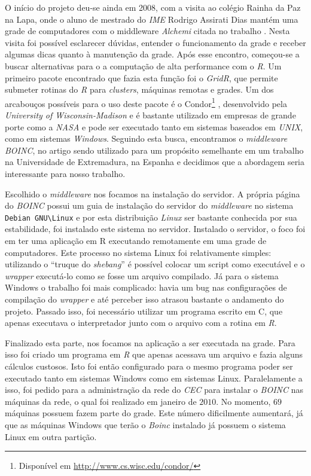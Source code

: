 
O início do projeto deu-se ainda em 2008, com a visita ao colégio Rainha da Paz na Lapa, onde o aluno de mestrado do \textit{IME}
Rodrigo Assirati Dias mantém uma grade de computadores com o middleware \textit{Alchemi} citada no trabalho \cite{Dias}.
Nesta visita foi possível esclarecer dúvidas, entender o funcionamento da grade e receber algumas dicas quanto à manutenção da grade. 
Após esse encontro, começou-se a buscar alternativas para o a computação de alta performance com o \textit{R}. Um primeiro pacote encontrado
que fazia esta função foi o \textit{GridR}, que permite submeter rotinas do \textit{R} para \textit{clusters}, máquinas remotas e 
grades. Um dos arcabouços possíveis para o uso deste pacote é o Condor\footnote{Disponível em \url{http://www.cs.wisc.edu/condor/}}
, desenvolvido pela \textit{University of Wisconsin-Madison} e é bastante utilizado em empresas
de grande porte como a \textit{NASA} e pode ser executado tanto em sistemas
baseados em \textit{UNIX}, como em sistemas \textit{Windows}. Seguindo esta busca, encontramos o 
\textit{middleware} \textit{BOINC}, no artigo \cite{boinc}
sendo utilizado para um propósito semelhante em um trabalho na Universidade de Extremadura, na Espanha 
e decidimos que a abordagem seria interessante para nosso trabalho.

Escolhido o \textit{middleware} nos focamos na instalação do servidor. A própria página do \textit{BOINC} 
possui um guia de instalação do servidor do \textit{middleware} no sistema \verb#Debian GNU\Linux# e por
esta distribuição \textit{Linux} ser bastante conhecida por sua estabilidade, foi instalado este sistema no servidor.
Instalado o servidor, o foco foi em ter uma aplicação em R executando remotamente em uma grade de computadores. 
Este processo no sistema Linux foi relativamente simples: utilizando o ``truque do \textit{shebang}'' é possível 
colocar um script como executável e o \textit{wrapper} executá-lo como se fosse um arquivo compilado. Já para
o sistema Windows %
o trabalho foi mais complicado: havia um bug nas configurações de compilação do \textit{wrapper} e até perceber isso
atrasou bastante o andamento do projeto. Passado isso, foi necessário utilizar um programa escrito em C, que apenas executava 
o interpretador junto com o arquivo com a rotina em \textit{R}.

Finalizado esta parte, nos focamos na aplicação a ser executada na grade. Para isso foi criado um programa em \textit{R} que
apenas acessava um arquivo e fazia alguns cálculos custosos. Isto foi então configurado para o mesmo programa poder
ser executado tanto em sistemas Windows como em sistemas Linux. Paralelamente a isso, foi pedido para a administração
da rede do \textit{CEC} para instalar o \textit{BOINC} nas máquinas da rede, o qual foi realizado em janeiro de $2010$. 
No momento, $69$ máquinas possuem fazem parte do grade. Este número dificilmente aumentará, já que as máquinas Windows
que terão o \emph{Boinc} instalado já possuem o sistema Linux em outra partição.



